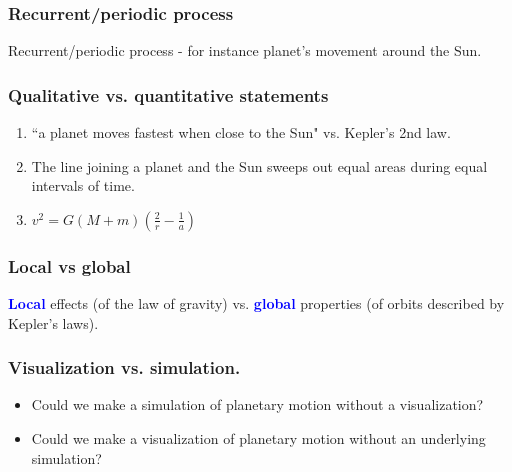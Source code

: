 \documentclass[aspectratio=169,xcolor=pdftex,dvipsnames]{beamer} %
\newcommand{\jemph}[1]{\textcolor{Blue}{\textbf{#1}}}
\begin{document}

\begin{frame}
\frametitle{Recurrent/periodic process}

Recurrent/periodic process - for instance planet's movement around the Sun.

\end{frame}


\begin{frame}
\frametitle{Qualitative vs. quantitative statements}

\begin{enumerate}
\item 
``a planet moves fastest when close to the Sun" vs. Kepler's 2nd law.
\item
The line joining a planet and the Sun
 sweeps out equal areas during equal intervals of time.
\item 
$v^2 = G(M+m) \left(\frac{2}{r} - \frac{1}{a}\right)$
\end{enumerate}


\end{frame}


\begin{frame}
\frametitle{Local vs global}

\jemph{Local} effects (of the law of gravity) vs.
\jemph{global} properties (of orbits described by Kepler's laws).

\end{frame}


\begin{frame}
\frametitle{Visualization vs. simulation.}

\begin{itemize}
\item
Could we make a simulation of planetary motion without a visualization?
\item
Could we make a visualization of planetary motion without an underlying simulation?
\end{itemize}

\end{frame}
\end{document}

